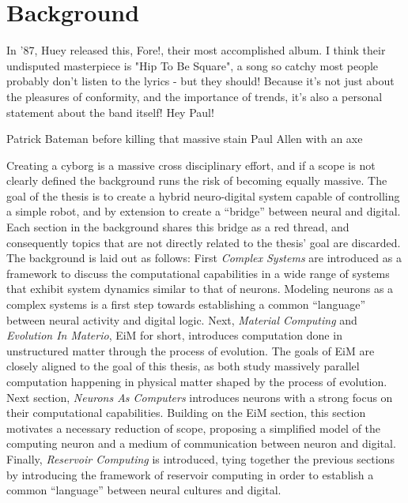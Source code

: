 \chapter{Background}
\epigraph{
In '87, Huey released this, Fore!, their most accomplished album. I think their undisputed masterpiece is "Hip To Be Square", a song so catchy most people probably don't listen to the lyrics - but they should! Because it's not just about the pleasures of conformity, and the importance of trends, it's also a personal statement about the band itself! Hey Paul!
}{Patrick Bateman before killing that massive stain Paul Allen with an axe}
Creating a cyborg is a massive cross disciplinary effort, and if a scope is not
clearly defined the background runs the risk of becoming equally massive.
The goal of the thesis is to create a hybrid neuro-digital system capable of
controlling a simple robot, and by extension to create a ``bridge'' between
neural and digital.
Each section in the background shares this bridge as a red thread, and
consequently topics that are not directly related to the thesis' goal are discarded.
The background is laid out as follows:
First \emph{Complex Systems} are introduced as a framework to discuss the computational
capabilities in a wide range of systems that exhibit system dynamics similar to
that of neurons.
Modeling neurons as a complex systems is a first step towards establishing a
common ``language'' between neural activity and digital logic.
%
Next, \emph{Material Computing} and \emph{Evolution In Materio}, EiM for short,
introduces computation done in unstructured matter through the process of
evolution. The goals of EiM are closely aligned to the goal of this thesis, as
both study massively parallel computation happening in physical matter shaped by
the process of evolution.
%
Next section, \emph{Neurons As Computers} introduces neurons with a strong focus
on their computational capabilities.
Building on the EiM section, this section motivates a necessary reduction of
scope, proposing a simplified model of the computing neuron and a medium of
communication between neuron and digital.
%
Finally, \emph{Reservoir Computing} is introduced, tying together the previous
sections by introducing the framework of reservoir computing in order to
establish a common ``language'' between neural cultures and digital.
